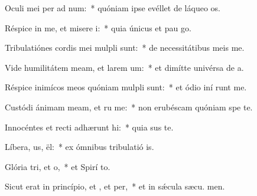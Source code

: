 \item Oculi mei per ad num:~* quóniam ipse evéllet de láqueo  os.
\item Réspice in me, et misere i:~* quia únicus et pau  go.
\item Tribulatiónes cordis mei mulpli sunt:~* de necessitátibus meis  me.
\item Vide humilitátem meam, et larem um:~* et dimítte univérsa de a.
\item Réspice inimícos meos quóniam mulpli sunt:~* et ódio iní runt me.
\item Custódi ánimam meam, et ru me:~* non erubéscam quóniam spe  te.
\item Innocéntes et recti adhærunt hi:~* quia sus te.
\item Líbera, us, ël:~* ex ómnibus tribulatió is.
\item Glória tri, et o,~* et Spirí to.
\item Sicut erat in princípio, et , et per,~* et in sǽcula sæcu. men.
